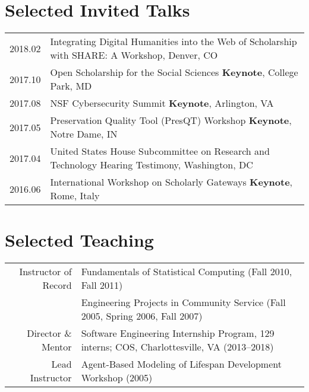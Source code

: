 \documentclass[11pt]{article}
\begin{document}
\section*{Selected Invited Talks}
\begin{tabularx}{\textwidth}{lX}
 2018.02		& Integrating Digital Humanities into the Web of Scholarship with SHARE: A Workshop, Denver, CO\\
    2017.10		& Open Scholarship for the Social Sciences \textbf{Keynote}, College Park, MD\\
    2017.08     & NSF Cybersecurity Summit \textbf{Keynote}, Arlington, VA \\ %
    2017.05     & Preservation Quality Tool (PresQT) Workshop \textbf{Keynote}, Notre Dame, IN\\%
    2017.04     & United States House Subcommittee on Research and Technology Hearing Testimony, Washington, DC\\ %
    2016.06     & International Workshop on Scholarly Gateways \textbf{Keynote}, Rome, Italy\\
\end{tabularx}

\section*{Selected Teaching}
\begin{tabularx}{\textwidth}{rX}
	Instructor of Record  & \textbullet \hspace{.25em} Fundamentals of Statistical Computing (Fall 2010, Fall 2011)\\
                            		& \textbullet \hspace{.25em} Engineering Projects in Community Service (Fall 2005, Spring 2006, Fall 2007)\\
	Director \& Mentor	& \textbullet \hspace{.25em} Software Engineering Internship Program, 129 interns; COS, Charlottesville, VA (2013--2018)\\
	Lead Instructor		& \textbullet \hspace{.25em} Agent-Based Modeling of Lifespan Development Workshop (2005)\\
\end{tabularx}
\end{document}
